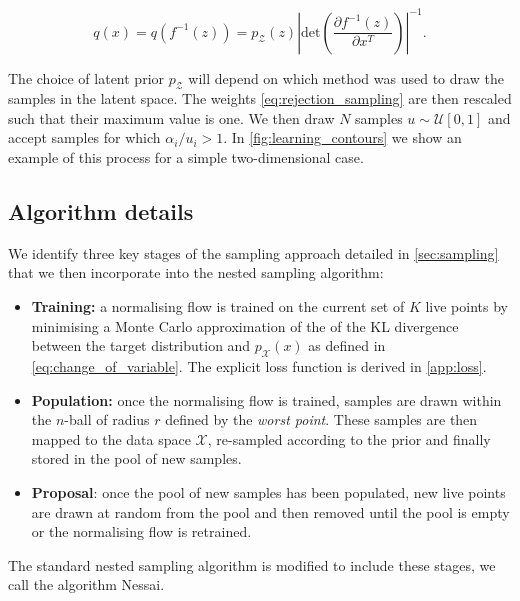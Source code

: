 \documentclass[%
 reprint,
nofootinbib,
 amsmath,amssymb,
 aps,
 prd,
]{revtex4-2}
\newcommand{\latent}{\mathcal{Z}}
\newcommand{\physical}{\mathcal{X}}
\newcommand{\nessai}{{\sc Nessai}\xspace}
\begin{document}
\begin{equation}\label{eq:proposal_prob}
    q(x) = q(f^{-1}(z)) = p_{\latent}(z)\left| \textrm{det} \left( \frac{\partial f^{-1}(z)}{\partial x^{T}}\right)\right|^{-1}.
\end{equation}

The choice of latent prior $p_{\latent}$ will depend on which method was used to draw the samples in the latent space. The weights \cref{eq:rejection_sampling} are then rescaled such that their maximum value is one. We then draw $N$ samples $u \sim \mathcal{U}[0, 1]$ and accept samples for which $\alpha_{i}/u_{i} > 1$. In \cref{fig:learning_contours} we show an example of this process for a simple two-dimensional case.

\subsection{Algorithm details}\label{sec:algorithm}

We identify three key stages of the sampling approach detailed in \cref{sec:sampling}  that we then incorporate into the nested sampling algorithm:

\begin{itemize}
    \item {\textbf{Training:} a normalising flow is trained on the current set of $K$ live points by minimising a Monte Carlo approximation of the of the KL divergence between the target distribution and $p_{\physical}(x)$ as defined in \cref{eq:change_of_variable}. The explicit loss function is derived in \cref{app:loss}.}
    \item {\textbf{Population:} once the normalising flow is trained, samples are drawn within the $n$-ball of radius $r$ defined by the \textit{worst point}. These samples are then mapped to the data space $\physical$, re-sampled according to the prior and finally stored in the pool of new samples.}
    \item {\textbf{Proposal}: once the pool of new samples has been populated, new live points are drawn at random from the pool and then removed until the pool is empty or the normalising flow is retrained.}
\end{itemize}

The standard nested sampling algorithm is modified to include these stages, we call the algorithm \nessai. 
\end{document}
